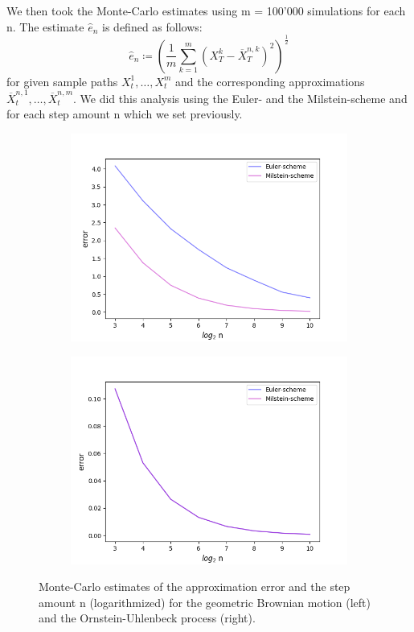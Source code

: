 We then took the Monte-Carlo estimates using m = 100'000 simulations for each n. The estimate \(\hat{e}_n\) is defined as follows:
\[\hat{e}_n\coloneqq (\frac{1}{m}\sum_{k=1}^{m}(X_T^k - \overline{X}^{n,k}_{T})^2)^{\frac{1}{2}}\]
for given sample paths \(X_t^1,\ldots, X_t^m\) and the corresponding approximations \(\overline{X}^{n,1}_{t},\ldots,\overline{X}^{n,m}_{t}\).
We did this analysis using the Euler- and the Milstein-scheme and for each step amount n which we set previously.
\begin{figure}[!h]

\centering
   \begin{subfigure}{0.49\linewidth} \centering
     \includegraphics[scale=0.4]{Content/Graphics/ConvergenceEulerMilsteinGBM}
   \end{subfigure}
   \begin{subfigure}{0.49\linewidth} \centering
     \includegraphics[scale=0.4]{Content/Graphics/ConvergenceEulerMilsteinOU}
   \end{subfigure}
\caption{Monte-Carlo estimates of the approximation error and the step amount n (logarithmized) for the geometric Brownian motion (left) and the Ornstein-Uhlenbeck process (right).} 
\label{fig:erroranalysis}
\end{figure}

